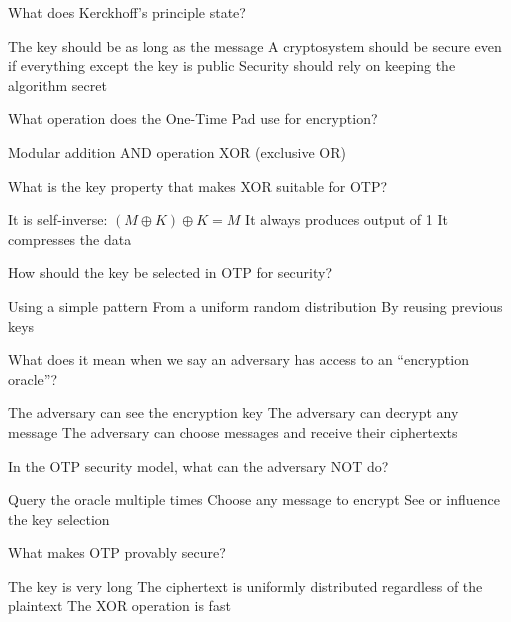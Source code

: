 \documentclass[10pt,a4paper,american]{exam}
\begin{document}
\begin{questions}
	\question What does Kerckhoff's principle state?
	\begin{randomizechoices}
		\choice The key should be as long as the message
		\CorrectChoice A cryptosystem should be secure even if everything except the key is public
		\choice Security should rely on keeping the algorithm secret
	\end{randomizechoices}

	\question What operation does the One-Time Pad use for encryption?
	\begin{randomizechoices}
		\choice Modular addition
		\choice AND operation
		\CorrectChoice XOR (exclusive OR)
	\end{randomizechoices}

	\question What is the key property that makes XOR suitable for OTP?
	\begin{randomizechoices}
		\CorrectChoice It is self-inverse: $(M \oplus K) \oplus K = M$
		\choice It always produces output of 1
		\choice It compresses the data
	\end{randomizechoices}

	\question How should the key be selected in OTP for security?
	\begin{randomizechoices}
		\choice Using a simple pattern
		\CorrectChoice From a uniform random distribution
		\choice By reusing previous keys
	\end{randomizechoices}

	\question What does it mean when we say an adversary has access to an ``encryption oracle''?
	\begin{randomizechoices}
		\choice The adversary can see the encryption key
		\choice The adversary can decrypt any message
		\CorrectChoice The adversary can choose messages and receive their ciphertexts
	\end{randomizechoices}

	\question In the OTP security model, what can the adversary NOT do?
	\begin{randomizechoices}
		\choice Query the oracle multiple times
		\choice Choose any message to encrypt
		\CorrectChoice See or influence the key selection
	\end{randomizechoices}

	\question What makes OTP provably secure?
	\begin{randomizechoices}
		\choice The key is very long
		\CorrectChoice The ciphertext is uniformly distributed regardless of the plaintext
		\choice The XOR operation is fast
	\end{randomizechoices}


\end{questions}
\end{document}
